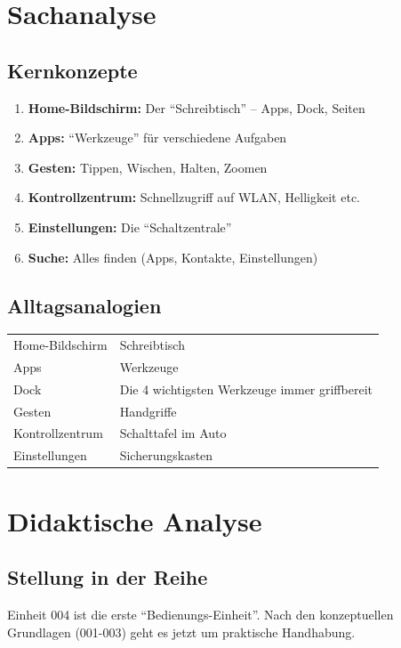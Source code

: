 \documentclass[11pt,a4paper]{article}
\begin{document}
\section{Sachanalyse}

\subsection{Kernkonzepte}
\begin{enumerate}
    \item \textbf{Home-Bildschirm:} Der ``Schreibtisch'' -- Apps, Dock, Seiten
    \item \textbf{Apps:} ``Werkzeuge'' für verschiedene Aufgaben
    \item \textbf{Gesten:} Tippen, Wischen, Halten, Zoomen
    \item \textbf{Kontrollzentrum:} Schnellzugriff auf WLAN, Helligkeit etc.
    \item \textbf{Einstellungen:} Die ``Schaltzentrale''
    \item \textbf{Suche:} Alles finden (Apps, Kontakte, Einstellungen)
\end{enumerate}

\subsection{Alltagsanalogien}
\begin{tabular}{|l|l|}
\hline
Home-Bildschirm & Schreibtisch \\
Apps & Werkzeuge \\
Dock & Die 4 wichtigsten Werkzeuge immer griffbereit \\
Gesten & Handgriffe \\
Kontrollzentrum & Schalttafel im Auto \\
Einstellungen & Sicherungskasten \\
\hline
\end{tabular}

\section{Didaktische Analyse}

\subsection{Stellung in der Reihe}
Einheit 004 ist die erste ``Bedienungs-Einheit''. Nach den konzeptuellen Grundlagen (001-003) geht es jetzt um praktische Handhabung.
\end{document}
